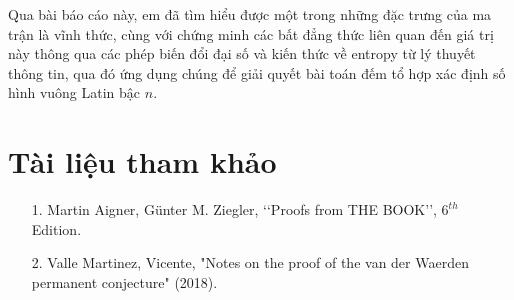 \documentclass[a4paper, 12pt]{report}
\begin{document}
	Qua bài báo cáo này, em đã tìm hiểu được một trong những đặc trưng của ma trận là vĩnh thức,  cùng với chứng minh các bất đẳng thức liên quan đến giá trị này thông qua các phép biến đổi đại số và kiến thức về entropy từ lý thuyết thông tin, qua đó ứng dụng chúng để giải quyết bài toán đếm tổ hợp xác định số hình vuông Latin bậc $n$.

	





%
%
%
\chapter*{Tài liệu tham khảo}
\mdseries
\begin{itemize}
\item[1.]
	Martin Aigner, Günter M. Ziegler, ‘‘Proofs from THE BOOK’’, $6^{th}$ Edition.
\item[2.]
	Valle Martinez, Vicente, "Notes on the proof of the van der Waerden permanent conjecture" (2018).
\end{itemize}
\end{document}

